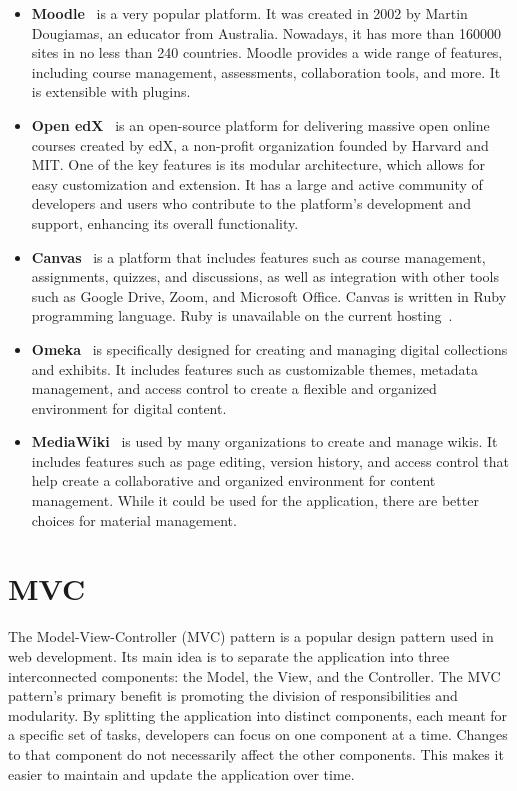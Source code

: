\documentclass[
  digital,     %
  oneside,     %
  nosansbold,  %
  colorbold, %
  lof,         %
  lot,         %
]{fithesis4}
\begin{document}
\begin{itemize}

	\item \textbf{Moodle}~\cite{moodle} is a very popular platform. It was created in 2002 by Martin Dougiamas, an educator from Australia. Nowadays, it has more than 160000 sites in no less than 240 countries. Moodle provides a wide range of features, including course management, assessments, collaboration tools, and more. It is extensible with plugins.

	\item \textbf{Open edX}~\cite{openedx} is an open-source platform for delivering massive open online courses created by edX, a non-profit organization founded by Harvard and MIT. One of the key features is its modular architecture, which allows for easy customization and extension. It has a large and active community of developers and users who contribute to the platform's development and support, enhancing its overall functionality.

	\item \textbf{Canvas}~\cite{canvas} is a platform that includes features such as course management, assignments, quizzes, and discussions, as well as integration with other tools such as Google Drive, Zoom, and Microsoft Office. Canvas is written in Ruby programming language. Ruby is unavailable on the current hosting~\cite{forpsi_data}.

	\item \textbf{Omeka}~\cite{omeka} is specifically designed for creating and managing digital collections and exhibits. It includes features such as customizable themes, metadata management, and access control to create a flexible and organized environment for digital content.

	\item \textbf{MediaWiki}~\cite{mediawiki} is used by many organizations to create and manage wikis. It includes features such as page editing, version history, and access control that help create a collaborative and organized environment for content management. While it could be used for the application, there are better choices for material management.

\end{itemize}

\section{MVC}
\label{sect:mvc}

The Model-View-Controller (MVC) pattern is a popular design pattern used in web development. Its main idea is to separate the application into three interconnected components: the Model, the View, and the Controller. The MVC pattern's primary benefit is promoting the division of responsibilities and modularity. By splitting the application into distinct components, each meant for a specific set of tasks, developers can focus on one component at a time. Changes to that component do not necessarily affect the other components. This makes it easier to maintain and update the application over time.
\end{document}
